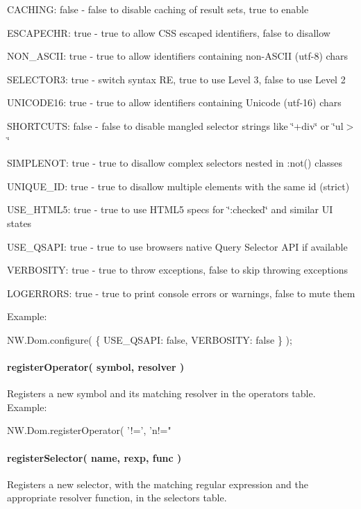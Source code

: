\begin{DoxyItemize}
\item {\ttfamily C\+A\+C\+H\+I\+NG}\+: false -\/ false to disable caching of result sets, true to enable
\item {\ttfamily E\+S\+C\+A\+P\+E\+C\+HR}\+: true -\/ true to allow C\+SS escaped identifiers, false to disallow
\item {\ttfamily N\+O\+N\+\_\+\+A\+S\+C\+II}\+: true -\/ true to allow identifiers containing non-\/\+A\+S\+C\+II (utf-\/8) chars
\item {\ttfamily S\+E\+L\+E\+C\+T\+O\+R3}\+: true -\/ switch syntax RE, true to use Level 3, false to use Level 2
\item {\ttfamily U\+N\+I\+C\+O\+D\+E16}\+: true -\/ true to allow identifiers containing Unicode (utf-\/16) chars
\item {\ttfamily S\+H\+O\+R\+T\+C\+U\+TS}\+: false -\/ false to disable mangled selector strings like \char`\"{}+div\char`\"{} or \char`\"{}ul$>$\char`\"{}
\item {\ttfamily S\+I\+M\+P\+L\+E\+N\+OT}\+: true -\/ true to disallow complex selectors nested in \textquotesingle{}\+:not()\textquotesingle{} classes
\item {\ttfamily U\+N\+I\+Q\+U\+E\+\_\+\+ID}\+: true -\/ true to disallow multiple elements with the same id (strict)
\item {\ttfamily U\+S\+E\+\_\+\+H\+T\+M\+L5}\+: true -\/ true to use H\+T\+M\+L5 specs for \char`\"{}\+:checked\char`\"{} and similar UI states
\item {\ttfamily U\+S\+E\+\_\+\+Q\+S\+A\+PI}\+: true -\/ true to use browsers native Query Selector A\+PI if available
\item {\ttfamily V\+E\+R\+B\+O\+S\+I\+TY}\+: true -\/ true to throw exceptions, false to skip throwing exceptions
\item {\ttfamily L\+O\+G\+E\+R\+R\+O\+RS}\+: true -\/ true to print console errors or warnings, false to mute them
\end{DoxyItemize}

Example\+:


\begin{DoxyCode}
NW.Dom.configure( \{ USE\_QSAPI: false, VERBOSITY: false \} );
\end{DoxyCode}


\paragraph*{{\ttfamily register\+Operator( symbol, resolver )}}

Registers a new symbol and its matching resolver in the operators table. Example\+:


\begin{DoxyCode}
NW.Dom.registerOperator( '!=', 'n!="%
\end{DoxyCode}


\paragraph*{{\ttfamily register\+Selector( name, rexp, func )}}

Registers a new selector, with the matching regular expression and the appropriate resolver function, in the selectors table. 